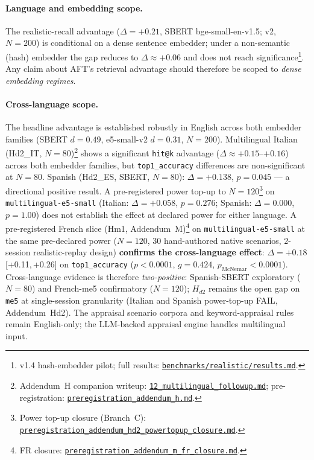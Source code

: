 \documentclass[11pt]{article}
\newcommand{\repourl}{https://github.com/gianlucamazza/emotional-memory}%
\begin{document}
\paragraph{Language and embedding scope.}
The realistic-recall advantage ($\Delta=+0.21$, SBERT bge-small-en-v1.5; v2,
$N=200$) is conditional on a dense sentence embedder; under a non-semantic
(hash) embedder the gap reduces to $\Delta\approx+0.06$ and does not reach
significance\footnote{v1.4 hash-embedder pilot; full results:
\href{\repourl/blob/main/benchmarks/realistic/results.md}{\texttt{benchmarks/realistic/results.md}}.}.
Any claim about AFT's retrieval advantage should therefore be scoped to
\emph{dense embedding regimes}.

\paragraph{Cross-language scope.}
The headline advantage is established robustly in English across both embedder
families (SBERT $d=0.49$, e5-small-v2 $d=0.31$, $N=200$).
Multilingual Italian (Hd2\_IT, $N=80$)\footnote{Addendum~H companion writeup:
\href{\repourl/blob/main/docs/research/12\_multilingual\_followup.md}{\texttt{12\_multilingual\_followup.md}};
pre-registration:
\href{\repourl/blob/main/benchmarks/preregistration\_addendum\_h.md}{\texttt{preregistration\_addendum\_h.md}}.}
shows a significant \texttt{hit@k} advantage ($\Delta\approx+0.15$--$+0.16$)
across both embedder families, but \texttt{top1\_accuracy} differences are
non-significant at $N=80$.
Spanish (Hd2\_ES, SBERT, $N=80$): $\Delta=+0.138$, $p=0.045$ — a directional
positive result.
A pre-registered power top-up to $N=120$\footnote{Power top-up closure (Branch~C):
\href{\repourl/blob/main/benchmarks/preregistration\_addendum\_hd2\_powertopup\_closure.md}%
{\texttt{preregistration\_addendum\_hd2\_powertopup\_closure.md}}.}
on \texttt{multilingual-e5-small} (Italian: $\Delta=+0.058$, $p=0.276$;
Spanish: $\Delta=0.000$, $p=1.00$) does not establish the effect at declared
power for either language.
A pre-registered French slice (Hm1, Addendum~M)\footnote{FR closure:
\href{\repourl/blob/main/benchmarks/preregistration\_addendum\_m\_fr\_closure.md}%
{\texttt{preregistration\_addendum\_m\_fr\_closure.md}}.}
on \texttt{multilingual-e5-small} at the same pre-declared power ($N=120$,
30 hand-authored native scenarios, 2-session realistic-replay design)
\textbf{confirms the cross-language effect}: $\Delta=+0.18$ [+0.11,\,+0.26]
on \texttt{top1\_accuracy} ($p{<}0.0001$, $g=0.424$, $p_{\mathrm{McNemar}}{<}0.0001$).
Cross-language evidence is therefore \emph{two-positive}: Spanish-SBERT
exploratory ($N=80$) and French-me5 confirmatory ($N=120$); $H_{d2}$ remains
the open gap on \texttt{me5} at single-session granularity (Italian and Spanish
power-top-up FAIL, Addendum~Hd2).
The appraisal scenario corpora and keyword-appraisal rules remain English-only;
the LLM-backed appraisal engine handles multilingual input.
\end{document}
